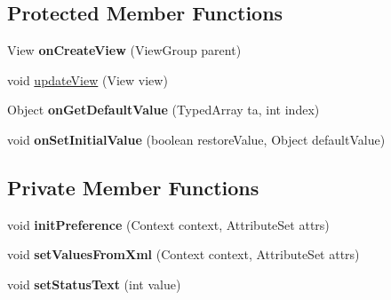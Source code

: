 \subsection*{Protected Member Functions}
\begin{DoxyCompactItemize}
\item 
\hypertarget{classcom_1_1qualoutdoor_1_1recorder_1_1settings_1_1SeekBarPreference_aeafbef26d4a6c8035694db79457389c4}{View {\bfseries on\-Create\-View} (View\-Group parent)}\label{classcom_1_1qualoutdoor_1_1recorder_1_1settings_1_1SeekBarPreference_aeafbef26d4a6c8035694db79457389c4}

\item 
void \hyperlink{classcom_1_1qualoutdoor_1_1recorder_1_1settings_1_1SeekBarPreference_a432d6cd94ab3305c33f40b8d9e9f6596}{update\-View} (View view)
\item 
\hypertarget{classcom_1_1qualoutdoor_1_1recorder_1_1settings_1_1SeekBarPreference_a478d8d677a78e89b7881609886ec08d6}{Object {\bfseries on\-Get\-Default\-Value} (Typed\-Array ta, int index)}\label{classcom_1_1qualoutdoor_1_1recorder_1_1settings_1_1SeekBarPreference_a478d8d677a78e89b7881609886ec08d6}

\item 
\hypertarget{classcom_1_1qualoutdoor_1_1recorder_1_1settings_1_1SeekBarPreference_acb2277a9f34bfdc5e6f2f24ffa9339e8}{void {\bfseries on\-Set\-Initial\-Value} (boolean restore\-Value, Object default\-Value)}\label{classcom_1_1qualoutdoor_1_1recorder_1_1settings_1_1SeekBarPreference_acb2277a9f34bfdc5e6f2f24ffa9339e8}

\end{DoxyCompactItemize}
\subsection*{Private Member Functions}
\begin{DoxyCompactItemize}
\item 
\hypertarget{classcom_1_1qualoutdoor_1_1recorder_1_1settings_1_1SeekBarPreference_a3c7f7b9c1c8f15f558ddee676075b880}{void {\bfseries init\-Preference} (Context context, Attribute\-Set attrs)}\label{classcom_1_1qualoutdoor_1_1recorder_1_1settings_1_1SeekBarPreference_a3c7f7b9c1c8f15f558ddee676075b880}

\item 
\hypertarget{classcom_1_1qualoutdoor_1_1recorder_1_1settings_1_1SeekBarPreference_a113af39764bc8f0a971343e3329ce052}{void {\bfseries set\-Values\-From\-Xml} (Context context, Attribute\-Set attrs)}\label{classcom_1_1qualoutdoor_1_1recorder_1_1settings_1_1SeekBarPreference_a113af39764bc8f0a971343e3329ce052}

\item 
\hypertarget{classcom_1_1qualoutdoor_1_1recorder_1_1settings_1_1SeekBarPreference_affdab4caa899961df8e800449d50e66a}{void {\bfseries set\-Status\-Text} (int value)}\label{classcom_1_1qualoutdoor_1_1recorder_1_1settings_1_1SeekBarPreference_affdab4caa899961df8e800449d50e66a}

\end{DoxyCompactItemize}
